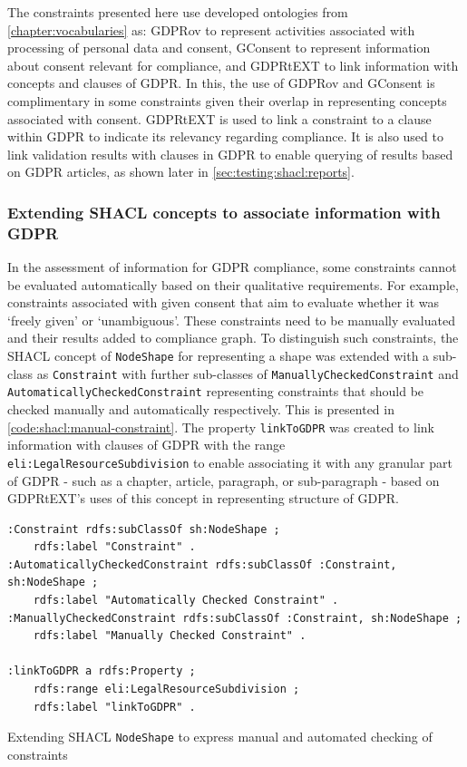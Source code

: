 The constraints presented here use developed ontologies from \autoref{chapter:vocabularies} as: GDPRov to represent activities associated with processing of personal data and consent, GConsent to represent information about consent relevant for compliance, and GDPRtEXT to link information with concepts and clauses of GDPR.
In this, the use of GDPRov and GConsent is complimentary in some constraints given their overlap in representing concepts associated with consent.
GDPRtEXT is used to link a constraint to a clause within GDPR to indicate its relevancy regarding compliance. It is also used to link validation results with clauses in GDPR to enable querying of results based on GDPR articles, as shown later in \autoref{sec:testing:shacl:reports}.

\subsubsection{Extending SHACL concepts to associate information with GDPR}
In the assessment of information for GDPR compliance, some constraints cannot be evaluated automatically based on their qualitative requirements. For example, constraints associated with given consent that aim to evaluate whether it was `freely given' or `unambiguous'. These constraints need to be manually evaluated and their results added to compliance graph.
To distinguish such constraints, the SHACL concept of \texttt{NodeShape} for representing a shape was extended with a sub-class as \texttt{Constraint} with further sub-classes of \texttt{ManuallyCheckedConstraint} and \texttt{AutomaticallyCheckedConstraint} representing constraints that should be checked manually and automatically respectively. This is presented in \autoref{code:shacl:manual-constraint}.
The property \texttt{linkToGDPR} was created to link information with clauses of GDPR with the range \texttt{eli:LegalResourceSubdivision} to enable associating it with any granular part of GDPR - such as a chapter, article, paragraph, or sub-paragraph - based on GDPRtEXT's uses of this concept in representing structure of GDPR.
\begin{listing}[htbp]
\begin{verbatim}
:Constraint rdfs:subClassOf sh:NodeShape ;
    rdfs:label "Constraint" .
:AutomaticallyCheckedConstraint rdfs:subClassOf :Constraint, sh:NodeShape ;
    rdfs:label "Automatically Checked Constraint" .
:ManuallyCheckedConstraint rdfs:subClassOf :Constraint, sh:NodeShape ;
    rdfs:label "Manually Checked Constraint" .
    
:linkToGDPR a rdfs:Property ;
    rdfs:range eli:LegalResourceSubdivision ;
    rdfs:label "linkToGDPR" .
\end{verbatim}
\caption{Extending SHACL \texttt{NodeShape} to express manual and automated checking of constraints}
\label{code:shacl:manual-constraint}
\end{listing}

